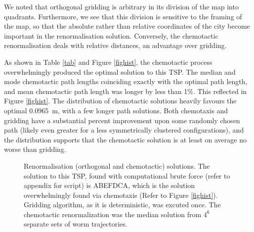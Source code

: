 \documentclass[10pt]{article}
\begin{document}
We noted that orthogonal gridding is arbitrary in its division of the map into quadrants. Furthermore, we see that this division is sensitive to the framing of the map, so that the absolute rather than relative coordinates of the city become important in the renormalisation solution. Conversely, the chemotactic renormalisation deals with relative distances, an advantage over gridding.

As shown in Table \ref{tab} and Figure \ref{fighist}, the chemotactic process overwhelmingly produced the optimal solution to this TSP. The median and mode chemotactic path lengths coinciding exactly with the optimal path length, and mean chemotactic path length was longer by less than 1\%. This reflected in Figure \ref{fighist}. The distribution of chemotactic solutions heavily favours the optimal \SI{0.0965}{\metre}, with a few longer path solutions. Both chemotaxis and gridding have a substantial percent improvement upon some randomly chosen path (likely even greater for a less symmetrically clustered configurations), and the distribution supports that the chemotactic solution is at least on average no worse than gridding.


\begin{figure}[H]
	\centering
    \caption{Renormalisation (orthogonal and chemotactic) solutions. The solution to this TSP, found with computational brute force (refer to appendix for script) is ABEFDCA, which is the solution overwhelmingly found via chemotaxis (Refer to Figure \ref{fighist}). Gridding algorithm, as it is deterministic, was excuted once. The chemotactic renormalization was the median solution from $4^6$ separate sets of worm trajectories.}
    \label{figsol}
\end{figure}
\end{document}
